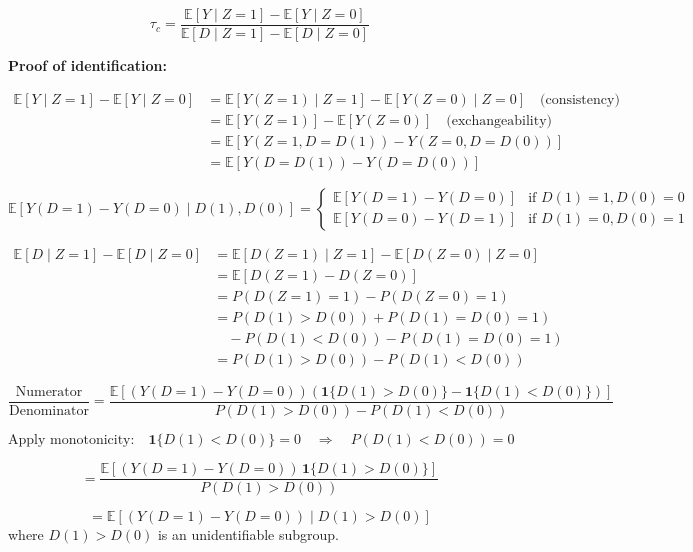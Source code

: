 \[
\tau_c = \frac{\mathbb{E}[Y \mid Z = 1] - \mathbb{E}[Y \mid Z = 0]}{\mathbb{E}[D \mid Z = 1] - \mathbb{E}[D \mid Z = 0]}
\]

\textbf{Proof of identification:}

\begin{align*}
\mathbb{E}[Y \mid Z = 1] - \mathbb{E}[Y \mid Z = 0] &= \mathbb{E}[Y(Z = 1) \mid Z = 1] - \mathbb{E}[Y(Z = 0) \mid Z = 0] \quad \text{(consistency)} \\
&= \mathbb{E}[Y(Z = 1)] - \mathbb{E}[Y(Z = 0)] \quad \text{(exchangeability)} \\
&= \mathbb{E}[Y(Z = 1, D = D(1)) - Y(Z = 0, D = D(0))] \\
&= \mathbb{E}[Y(D = D(1)) - Y(D = D(0))]
\end{align*}

\[
\mathbb{E}\left[ Y(D = 1) - Y(D = 0) \mid D(1), D(0) \right] =
\begin{cases}
    \mathbb{E}\left[ Y(D = 1) - Y(D = 0) \right] & \text{if } D(1) = 1, D(0) = 0 \\
    \mathbb{E}\left[ Y(D = 0) - Y(D = 1) \right] & \text{if } D(1) = 0, D(0) = 1
\end{cases}
\]

\begin{align*}
\mathbb{E}[D \mid Z = 1] - \mathbb{E}[D \mid Z = 0] &= \mathbb{E}[D(Z = 1) \mid Z = 1] - \mathbb{E}[D(Z = 0) \mid Z = 0] \\
&= \mathbb{E}[D(Z = 1) - D(Z = 0)] \\
&= P(D(Z = 1) = 1) - P(D(Z = 0) = 1) \\
&= P(D(1) > D(0)) + P(D(1) = D(0) = 1) \\
&\quad - P(D(1) < D(0)) - P(D(1) = D(0) = 1) \\
&= P(D(1) > D(0)) - P(D(1) < D(0))
\end{align*}

\[
\frac{\text{Numerator}}{\text{Denominator}} 
= \frac{\mathbb{E}\left[ (Y(D = 1) - Y(D = 0)) \left( \mathbf{1}\{D(1) > D(0)\} - \mathbf{1}\{D(1) < D(0)\} \right) \right]}{P(D(1) > D(0)) - P(D(1) < D(0))}
\]

\[
\text{Apply monotonicity:} \quad \mathbf{1}\{D(1) < D(0)\} = 0 \quad \Rightarrow \quad P(D(1) < D(0)) = 0
\]


\[
= \frac{\mathbb{E}\left[ (Y(D = 1) - Y(D = 0)) \, \mathbf{1}\{D(1) > D(0)\} \right]}{P(D(1) > D(0))}
\]

\[
= \mathbb{E}\left[ (Y(D = 1) - Y(D = 0)) \mid D(1) > D(0) \right]
\]
where \(D(1) > D(0)\) is an unidentifiable subgroup.

